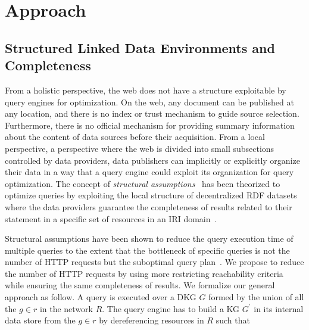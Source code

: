 \section{Approach}



\subsection{Structured Linked Data Environments and Completeness}\label{sec:slde}
From a holistic perspective, the web does not have a structure exploitable by query engines for optimization.
On the web, any document can be published at any location, and there is no index or trust mechanism to guide source selection.
Furthermore, there is no official mechanism for providing summary information about the content of data sources before their acquisition.
From a local perspective, a perspective where the web is divided into small subsections controlled by data providers, data publishers can implicitly or explicitly organize their data  
in a way that a query engine could exploit its organization for query optimization.
The concept of \emph{structural assumptions}~\cite{Taelman2023} has been theorized to optimize queries by exploiting the local structure of decentralized RDF datasets where the data providers 
guarantee the completeness of results related to their statement in a specific set of resources in an IRI domain~\cite{Bogaerts2021LinkTW}.

Structural assumptions have been shown to reduce the query execution time of multiple queries to the extent that the bottleneck of specific queries is not the number of HTTP requests but the suboptimal query plan~\cite{Taelman2023, eschauzier_quweda_linkqueue_2023}.
We propose to reduce the number of HTTP requests by using more restricting reachability criteria~\cite{Hartig2012} while ensuring the same completeness of results.
We formalize our general approach as follow.
A query is executed over a DKG $G$ formed by the union of all the $g \in r$ in the network $R$.
The query engine has to build a KG $G^{\prime}$ in its internal data store from the  $g \in r$ by dereferencing resources in $R$ such that

